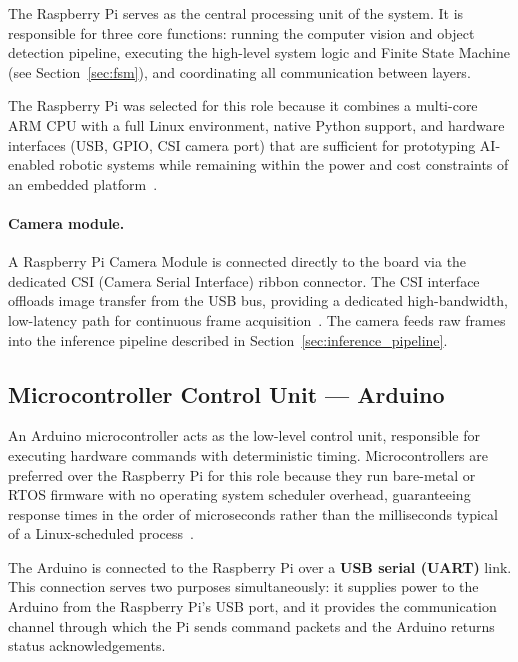 The Raspberry Pi serves as the central processing unit of the system.
It is responsible for three core functions: running the computer vision
and object detection pipeline, executing the high-level system logic
and Finite State Machine (see Section~\ref{sec:fsm}), and coordinating
all communication between layers.
 
The Raspberry Pi was selected for this role because it combines a
multi-core ARM CPU with a full Linux environment, native Python
support, and hardware interfaces (USB, GPIO, CSI camera port) that
are sufficient for prototyping AI-enabled robotic systems while
remaining within the power and cost constraints of an embedded
platform~\cite{upton2016raspberry}.
 
\paragraph{Camera module.}
A Raspberry Pi Camera Module is connected directly to the board via
the dedicated CSI (Camera Serial Interface) ribbon connector. The CSI
interface offloads image transfer from the USB bus, providing a
dedicated high-bandwidth, low-latency path for continuous frame
acquisition~\cite{picamera2023}. The camera feeds raw frames into the
inference pipeline described in Section~\ref{sec:inference_pipeline}.
 
\subsection{Microcontroller Control Unit — Arduino}
 
An Arduino microcontroller acts as the low-level control unit,
responsible for executing hardware commands with deterministic timing.
Microcontrollers are preferred over the Raspberry Pi for this role
because they run bare-metal or RTOS firmware with no operating system
scheduler overhead, guaranteeing response times in the order of
microseconds rather than the milliseconds typical of a
Linux-scheduled process~\cite{heath2002embedded}.
 
The Arduino is connected to the Raspberry Pi over a \textbf{USB serial
(UART)} link. This connection serves two purposes simultaneously: it
supplies power to the Arduino from the Raspberry Pi's USB port, and it
provides the communication channel through which the Pi sends command
packets and the Arduino returns status acknowledgements.
 
